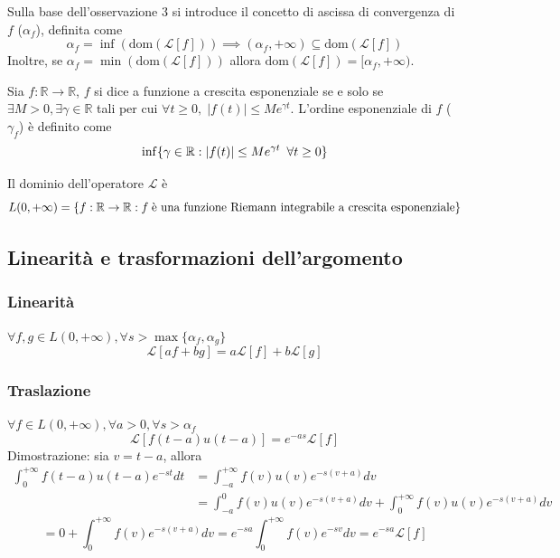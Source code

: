             Sulla base dell'osservazione 3 si introduce il concetto di ascissa di convergenza di $f$ ($\alpha_f$), definita come
            \[
                \alpha_f = \inf(\text{dom}(\mathcal{L}[f])) \implies (\alpha_f, +\infty) \subseteq \text{dom}(\mathcal{L}[f])
            \]
            Inoltre, se $\alpha_f = \min(\text{dom}(\mathcal{L}[f]))$ allora $\text{dom}(\mathcal{L}[f]) = [\alpha_f, +\infty)$.

            \begin{definition}
                Sia $f: \mathbb{R} \rightarrow \mathbb{R}$, $f$ si dice a funzione a crescita esponenziale se e solo se $\exists M > 0, \exists \gamma \in \mathbb{R}$ tali per cui
                $\forall t \geq 0, \; |f(t)| \leq Me^{\gamma t}$. L'ordine esponenziale di $f$ ($\gamma_f$) è definito come
                \[
                    \inf \{ \gamma \in \mathbb{R} \mathrel{:} |f(t)| \leq Me^{\gamma t} \;\: \forall t \geq 0\}
                \]
            \end{definition}

            Il dominio dell'operatore $\mathcal{L}$ è
            \[
                L(0, +\infty) = \{ f: \mathbb{R} \rightarrow \mathbb{R} \mathrel{:} f \; \text{è una funzione Riemann integrabile a crescita esponenziale}\}
            \]

        \subsection{Linearità e trasformazioni dell'argomento}
            \subsubsection{Linearità}
                $\forall f, g \in L(0, +\infty), \forall s > \max\{\alpha_f, \alpha_g\}$
                \[
                    \mathcal{L}[af + bg] = a \mathcal{L}[f] + b \mathcal{L}[g]
                \]

            \subsubsection{Traslazione}
                $\forall f \in L(0, +\infty), \forall a > 0, \forall s > \alpha_f$
                \[
                    \mathcal{L}[f(t - a)u(t - a)] = e^{-as}\mathcal{L}[f]
                \]
                Dimostrazione: sia $v = t - a$, allora
                \[
                    \begin{aligned}
                        \int_{0}^{+\infty} f(t - a)u(t - a) e^{-st} dt
                        &= \int_{-a}^{+\infty} f(v)u(v) e^{-s(v + a)} dv \\
                        &= \int_{-a}^{0} f(v)u(v) e^{-s(v + a)} dv
                        + \int_{0}^{+\infty} f(v)u(v) e^{-s(v + a)} dv
                    \end{aligned}
                \]
                \[
                    = 0 + \int_{0}^{+\infty} f(v) e^{-s(v + a)} dv = e^{-sa} \int_{0}^{+\infty} f(v) e^{-sv} dv = e^{-sa} \mathcal{L}[f]
                \]

